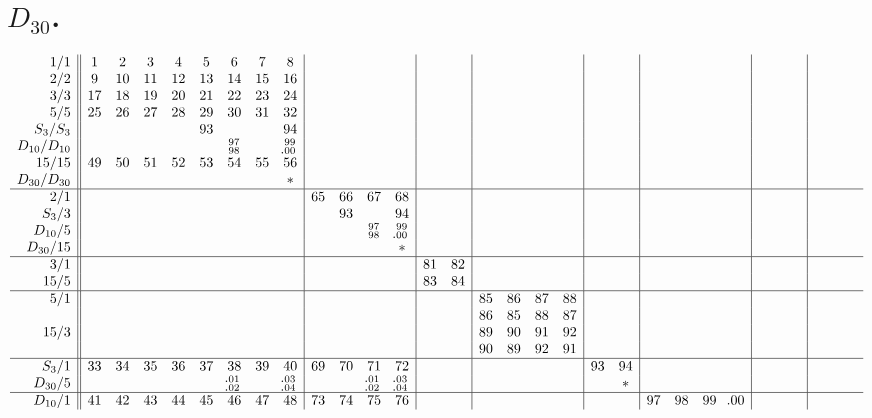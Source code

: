 \documentclass[12pt,a4paper]{amsart}
\begin{document}
\section*{$D_{30}$.}
\footnotesize
\begin{align*}
\begin{array}{r||cccccccc|cccc|cc|cccc|cc|cccc|cccc|cccc}
1/1&
 1& 2& 3& 4& 5& 6& 7& 8&&&&&&&&&&&&&&&&&&&&&&&&\\
2/2&
 9&10&11&12&13&14&15&16&&&&&&&&&&&&&&&&&&&&&&&&\\
3/3&
17&18&19&20&21&22&23&24&&&&&&&&&&&&&&&&&&&&&&&&\\
5/5&
25&26&27&28&29&30&31&32&&&&&&&&&&&&&&&&&&&&&&&&\\
S_3/S_3&
  &  &  &  &93&  &  &94&&&&&&&&&&&&&&&&&&&&&&&&\\
D_{10}/D_{10}&
&&&&&^{97}_{98}&&^{99}_{\llap{.}00}&&&&&&&&&&&&&&&&&&&&&&\\
15/15&
49&50&51&52&53&54&55&56&&&&&&&&&&&&&&&&&&&&&&&&\\
D_{30}/D_{30}&
  &  &  &  &  &  &  & *&&&&&&&&&&&&&&&&&&&&&&&&\\ \hline
2/1&
  &  &  &  &  &  &  &  &65&66&67&68&&&&&&&&&&&&&&&&&&&&\\
S_3/3&
  &  &  &  &  &  &  &  &  &93&  &94&&&&&&&&&&&&&&&&&&&&\\
D_{10}/5
&&&&&&&&&&&^{97}_{98}&^{99}_{\llap{.}00}&&&&&&&&&&&&&&&&&&\\
D_{30}/15&
  &  &  &  &  &  &  &  &  &  &  & *&&&&&&&&&&&&&&&&&&&&\\ \hline
3/1&
  &  &  &  &  &  &  &  &  &  &  &  &81&82&&&&&&&&&&&&&&&&&&\\
15/5&
  &  &  &  &  &  &  &  &  &  &  &  &83&84&&&&&&&&&&&&&&&&&&\\ \hline
5/1&
  &  &  &  &  &  &  &  &  &  &  &  &  &  &85&86&87&88&&&&&&&&&&&&&&\\
&
  &  &  &  &  &  &  &  &  &  &  &  &  &  &86&85&88&87&&&&&&&&&&&&&&\\
15/3&
  &  &  &  &  &  &  &  &  &  &  &  &  &  &89&90&91&92&&&&&&&&&&&&&&\\
&
  &  &  &  &  &  &  &  &  &  &  &  &  &  &90&89&92&91&&&&&&&&&&&&&&\\ \hline
S_3/1&
33&34&35&36&37&38&39&40&69&70&71&72&  &  &  &  &  &  &93&94&&&&&&&&&&&&\\
D_{30}/5&
&&&&&^{\llap{.}01}_{\llap{.}02}&&^{\llap{.}03}_{\llap{.}04}&&&^{\llap{.}01}_{\llap{.}02}&^{\llap{.}03}_{\llap{.}04}&&&&&&&  & *&&&&&&&&&&&&\\ \hline
D_{10}/1&
41&42&43&44&45&46&47&48&73&74&75&76&  &  &  &  &  &  &  &  &97&98&99&\llap{.}00&&&&&&&&\\

\end{array}
\end{align*}
\end{document}
